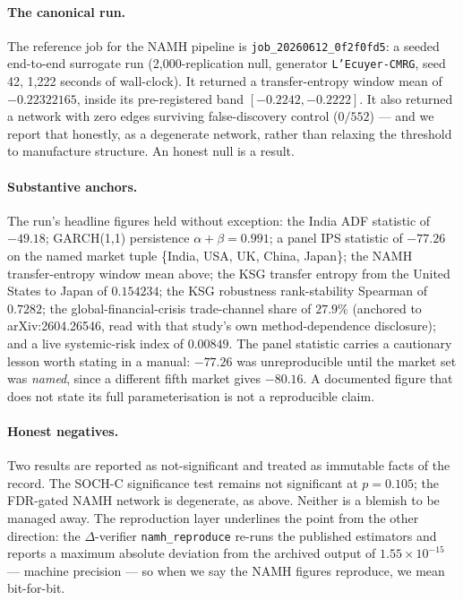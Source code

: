 \documentclass[11pt]{article}
\newcommand{\code}[1]{\texttt{\small #1}}
\begin{document}
\paragraph{The canonical run.} The reference job for the NAMH pipeline is
\code{job\_20260612\_0f2f0fd5}: a seeded end-to-end surrogate run
(2{,}000-replication null, generator \code{L'Ecuyer-CMRG}, seed 42, 1{,}222
seconds of wall-clock). It returned a transfer-entropy window mean of
$-0.22322165$, inside its pre-registered band $[-0.2242, -0.2222]$. It also
returned a network with zero edges surviving false-discovery control
($0/552$) --- and we report that honestly, as a degenerate network, rather than
relaxing the threshold to manufacture structure. An honest null is a result.

\paragraph{Substantive anchors.} The run's headline figures held without
exception: the India ADF statistic of $-49.18$; GARCH(1,1) persistence
$\alpha+\beta=0.991$; a panel IPS statistic of $-77.26$ on the named market
tuple \{India, USA, UK, China, Japan\}; the NAMH transfer-entropy window mean
above; the KSG transfer entropy from the United States to Japan of $0.154234$;
the KSG robustness rank-stability Spearman of $0.7282$; the global-financial-crisis
trade-channel share of $27.9\%$ (anchored to arXiv:2604.26546, read with that
study's own method-dependence disclosure); and a live systemic-risk index of
$0.00849$. The panel statistic carries a cautionary lesson worth stating in a
manual: $-77.26$ was unreproducible until the market set was \emph{named}, since
a different fifth market gives $-80.16$. A documented figure that does not state
its full parameterisation is not a reproducible claim.

\paragraph{Honest negatives.} Two results are reported as not-significant and
treated as immutable facts of the record. The SOCH-C significance test remains
not significant at $p=0.105$; the FDR-gated NAMH network is degenerate, as
above. Neither is a blemish to be managed away. The reproduction layer
underlines the point from the other direction: the $\Delta$-verifier
\code{namh\_reproduce} re-runs the published estimators and reports a maximum
absolute deviation from the archived output of $1.55\times10^{-15}$ --- machine
precision --- so when we say the NAMH figures reproduce, we mean bit-for-bit.
\end{document}
